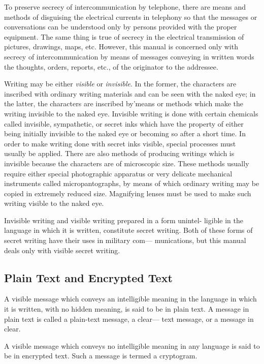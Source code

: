 \mypara To preserve secrecy of intercommunication by telephone, there are
means and methods of disguising the electrical currents in telephony so
that the messages or conversations can be understood only by persons
provided with the proper equipment. The same thing is true of secrecy
in the electrical transmission of pictures, drawings, maps, etc. However,
this manual is concerned only with secrecy of intercommunication by
means of messages conveying in written words the thoughts, orders,
reports, etc., of the originator to the addressee.

\mypara Writing may be either \textit{visible} or \textit{invisible}. In the former, the characters are inscribed with ordinary writing materials and can be seen with
the naked eye; in the latter, the characters are inscribed by'means or
methods which make the writing invisible to the naked eye. Invisible
writing is done with certain chemicals called invisible, sympathetic, or
secret inks which have the property of either being initially invisible to
the naked eye or becoming so after a short time. In order to make writing
done with secret inks visible, special processes must usually be applied.
There are also methods of producing writings which is invisible because
the characters are of microscopic size. These methods usually require
either special photographic apparatus or very delicate mechanical instruments called micropantographs, by means of which ordinary writing may
be copied in extremely reduced size. Magnifying lenses must be used to
make such writing visible to the naked eye.

\mypara Invisible writing and visible writing prepared in a form unintel-
ligible in the language in which it is written, constitute secret writing.
Both of these forms of secret writing have their uses in military com—
munications, but this manual deals only with visible secret writing.

\subsection{Plain Text and Encrypted Text}

\mypara A visible message which conveys an intelligible meaning in the
language in which it is written, with no hidden meaning, is said to be in
plain text. A message in plain text is called a plain-text message, a clear—
text message, or a message in clear.

\mypara A visible message which conveys no intelligible meaning in any
language is said to be in encrypted text. Such a message is termed a
cryptogram.

